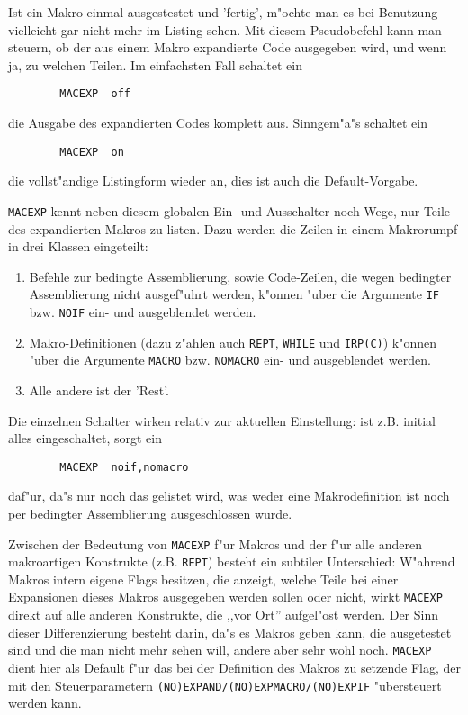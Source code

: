 \documentclass[12pt,a4paper,twoside]{report}
\newcommand{\tty}[1]{{\tt #1}}
\begin{document}
{Ist ein Makro einmal ausgestestet und 'fertig', m"ochte man es bei
Benutzung vielleicht gar nicht mehr im Listing sehen.  Mit diesem
Pseudobefehl kann man steuern, ob der aus einem Makro expandierte
Code ausgegeben wird, und wenn ja, zu welchen Teilen.  Im
einfachsten Fall schaltet ein
\begin{verbatim}
        MACEXP  off
\end{verbatim}
die Ausgabe des expandierten Codes komplett aus.  Sinngem"a"s schaltet
ein 
\begin{verbatim}
        MACEXP  on
\end{verbatim}
die vollst"andige Listingform wieder an, dies ist auch die Default-Vorgabe.
\par
\tty{MACEXP} kennt neben diesem globalen Ein- und Ausschalter
noch Wege, nur Teile des expandierten Makros zu listen.  Dazu
werden die Zeilen in einem Makrorumpf in drei Klassen eingeteilt:
\begin{enumerate}
\item{Befehle zur bedingte Assemblierung, sowie Code-Zeilen, die
      wegen bedingter Assemblierung nicht ausgef"uhrt werden,
      k"onnen "uber die Argumente \tty{IF} bzw. \tty{NOIF} ein- und
      ausgeblendet werden.}
\item{Makro-Definitionen (dazu z"ahlen auch \tty{REPT},
      \tty{WHILE} und \tty{IRP(C)}) k"onnen "uber die Argumente
      \tty{MACRO} bzw. \tty{NOMACRO} ein- und
      ausgeblendet werden.}
\item{Alle andere ist der 'Rest'.}
\end{enumerate}
Die einzelnen Schalter wirken relativ zur aktuellen Einstellung:
ist z.B. initial alles eingeschaltet, sorgt ein
\begin{verbatim}
        MACEXP  noif,nomacro
\end{verbatim}
daf"ur, da"s nur noch das gelistet wird, was weder eine
Makrodefinition ist noch per bedingter Assemblierung
ausgeschlossen wurde.
\par
Zwischen der Bedeutung von \tty{MACEXP} f"ur Makros und der f"ur alle
anderen makroartigen Konstrukte (z.B. \tty{REPT}) besteht ein subtiler
Unterschied: W"ahrend Makros intern eigene Flags besitzen, die anzeigt,
welche Teile bei einer Expansionen dieses Makros ausgegeben werden sollen
oder nicht, wirkt \tty{MACEXP} direkt auf alle anderen Konstrukte, die
,,vor Ort'' aufgel"ost werden.  Der Sinn dieser Differenzierung besteht
darin, da"s es Makros geben kann, die ausgetestet sind und die man nicht
mehr sehen will, andere aber sehr wohl noch.  \tty{MACEXP} dient hier als
Default f"ur das bei der Definition des Makros zu setzende Flag, der mit
den Steuerparametern \tty{(NO)EXPAND/(NO)EXPMACRO/(NO)EXPIF} "ubersteuert
werden kann.

}
\end{document}
